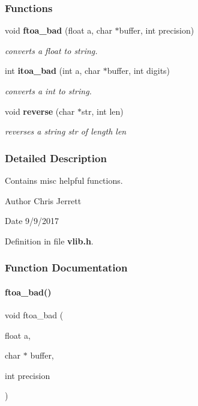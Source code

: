 \subsubsection*{Functions}
\begin{DoxyCompactItemize}
\item 
void \textbf{ ftoa\+\_\+bad} (float a, char $\ast$buffer, int precision)
\begin{DoxyCompactList}\small\item\em converts a float to string. \end{DoxyCompactList}\item 
int \textbf{ itoa\+\_\+bad} (int a, char $\ast$buffer, int digits)
\begin{DoxyCompactList}\small\item\em converts a int to string. \end{DoxyCompactList}\item 
void \textbf{ reverse} (char $\ast$str, int len)
\begin{DoxyCompactList}\small\item\em reverses a string \textquotesingle{}str\textquotesingle{} of length \textquotesingle{}len\textquotesingle{} \end{DoxyCompactList}\end{DoxyCompactItemize}


\subsubsection{Detailed Description}
Contains misc helpful functions. 

\begin{DoxyAuthor}{Author}
Chris Jerrett 
\end{DoxyAuthor}
\begin{DoxyDate}{Date}
9/9/2017 
\end{DoxyDate}


Definition in file \textbf{ vlib.\+h}.



\subsubsection{Function Documentation}
\mbox{\label{vlib_8h_a8805990ed667939e615e4a98950b8bd1}} 
\paragraph{ftoa\+\_\+bad()}
{\footnotesize\ttfamily void ftoa\+\_\+bad (\begin{DoxyParamCaption}\item[{float}]{a,  }\item[{char $\ast$}]{buffer,  }\item[{int}]{precision }\end{DoxyParamCaption})}



